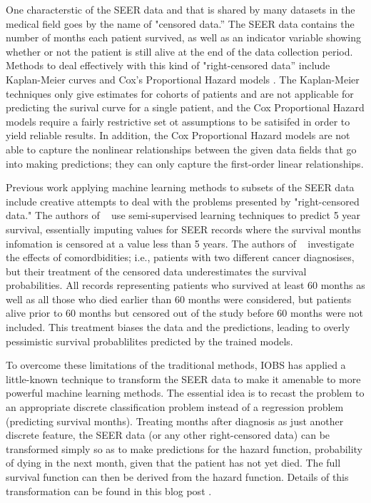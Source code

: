 \documentclass[a4paper,11pt]{article}
\begin{document}
One characterstic of the SEER data and that is shared by many datasets in the medical field 
goes by the name of "censored data.'' The SEER data contains the number of months each patient survived, as well as an indicator variable showing whether or not the patient is still alive at the end of the data collection period.
Methods to deal effectively with this kind of "right-censored data'' include Kaplan-Meier curves
and Cox's Proportional Hazard models \cite{cam}. The Kaplan-Meier techniques only give estimates for cohorts of patients and are not applicable for predicting the surival curve for a single patient, and the Cox Proportional Hazard models require a fairly restrictive set ot assumptions to be satisifed in order to yield reliable results. In addition, the Cox Proportional Hazard models are not able to capture the nonlinear relationships between the given data fields that go into making predictions; they can only capture the first-order linear relationships.

Previous work applying machine learning methods to subsets of the SEER data include creative attempts to deal with the problems presented by  "right-censored data." The authors of ~\cite{ISI:000337467400005} use semi-supervised learning techniques to predict 5 year survival, essentially imputing values for SEER records where the survival months infomation is censored at a value less than 5 years. The authors of ~\cite{ISI:000355882700012} investigate the effects of comordbidities; i.e., patients with two different cancer diagnosises, but their treatment of the censored data underestimates the survival probabilities. All records representing patients who survived at least 60 months as well as all those who died earlier than 60 months were considered, but patients alive prior to 60 months but censored out of the study before 60 months were not included. This treatment biases the data and the predictions, leading to overly pessimistic survival probablilites predicted by the trained models.

To overcome these limitations of the traditional methods, IOBS has applied a little-known technique to transform the SEER data to make it amenable to more powerful machine learning methods. The essential idea is to recast the problem to an appropriate discrete classification problem instead of a regression problem (predicting survival months). Treating months after diagnosis as just another discrete feature, the SEER data (or any other right-censored data) can be transformed simply so as to make predictions for the hazard function, 
 probability of dying in the next month, given that the patient has not yet died.
The full survival function can then be derived from the hazard function.
Details of this transformation can be found in this blog post \cite{kuhn}.
\end{document}

